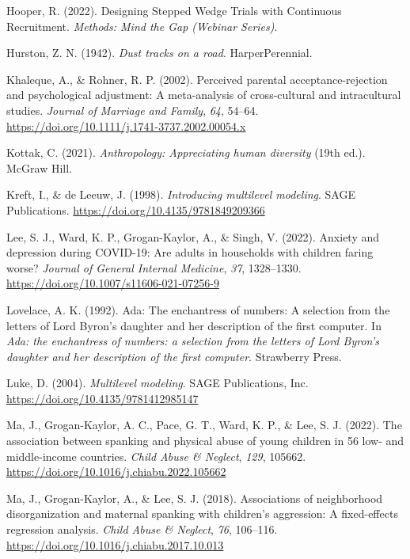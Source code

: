 \documentclass[
  letterpaper,
  DIV=11,
  numbers=noendperiod]{scrreprt}
\newlength{\cslhangindent}
\newenvironment{CSLReferences}[2] %
 {\begin{list}{}{%
  \setlength{\itemindent}{0pt}
  \setlength{\leftmargin}{0pt}
  \setlength{\parsep}{0pt}
  \ifodd #1
   \setlength{\leftmargin}{\cslhangindent}
   \setlength{\itemindent}{-1\cslhangindent}
  \fi
  \setlength{\itemsep}{#2\baselineskip}}}
 {\end{list}}
\begin{document}
\begin{CSLReferences}{1}{0}
Hooper, R. (2022). {Designing Stepped Wedge Trials with Continuous
Recruitment}. \emph{Methods: Mind the Gap (Webinar Series)}.

Hurston, Z. N. (1942). \emph{Dust tracks on a road}. HarperPerennial.

Khaleque, A., \& Rohner, R. P. (2002). Perceived parental
acceptance-rejection and psychological adjustment: A meta-analysis of
cross-cultural and intracultural studies. \emph{Journal of Marriage and
Family}, \emph{64}, 54--64.
\url{https://doi.org/10.1111/j.1741-3737.2002.00054.x}

Kottak, C. (2021). \emph{Anthropology: Appreciating human diversity}
(19th ed.). McGraw Hill.

Kreft, I., \& de Leeuw, J. (1998). \emph{Introducing multilevel
modeling}. SAGE Publications.
\url{https://doi.org/10.4135/9781849209366}

Lee, S. J., Ward, K. P., Grogan-Kaylor, A., \& Singh, V. (2022). Anxiety
and depression during {COVID-19}: Are adults in households with children
faring worse? \emph{Journal of General Internal Medicine}, \emph{37},
1328--1330. \url{https://doi.org/10.1007/s11606-021-07256-9}

Lovelace, A. K. (1992). Ada: The enchantress of numbers: A selection
from the letters of {L}ord {B}yron's daughter and her description of the
first computer. In \emph{Ada: the enchantress of numbers: a selection
from the letters of {L}ord {B}yron's daughter and her description of the
first computer}. Strawberry Press.

Luke, D. (2004). \emph{Multilevel modeling}. SAGE Publications, Inc.
\url{https://doi.org/10.4135/9781412985147}

Ma, J., Grogan-Kaylor, A. C., Pace, G. T., Ward, K. P., \& Lee, S. J.
(2022). {The association between spanking and physical abuse of young
children in 56 low- and middle-income countries}. \emph{Child Abuse \&
Neglect}, \emph{129}, 105662.
\url{https://doi.org/10.1016/j.chiabu.2022.105662}

Ma, J., Grogan-Kaylor, A., \& Lee, S. J. (2018). Associations of
neighborhood disorganization and maternal spanking with children's
aggression: A fixed-effects regression analysis. \emph{Child Abuse \&
Neglect}, \emph{76}, 106--116.
\url{https://doi.org/10.1016/j.chiabu.2017.10.013}


\end{CSLReferences}
\end{document}
